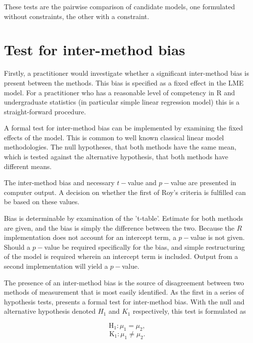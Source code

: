 \documentclass[12pt, a4paper]{report}
\theoremstyle{plain}
\theoremstyle{definition}
\theoremstyle{remark}
\begin{document}
These tests are the pairwise comparison of candidate models, one formulated without constraints, the other with a constraint.

\bigskip



\section{Test for inter-method bias}

Firstly, a practitioner would investigate whether a significant inter-method bias is present between the methods. This bias is specified as a fixed effect in the LME model.  For a practitioner who has a reasonable level of competency in R and undergraduate statistics (in particular simple linear regression model) this is a straight-forward procedure.

A formal test for inter-method bias can be implemented by examining the fixed effects of the model. This is common to well known classical linear model methodologies. The null hypotheses, that both methods have the same mean, which is tested against the alternative hypothesis, that both methods have different means.

The inter-method bias and necessary $t-$value and $p-$value are presented in computer output. A decision on whether the first of Roy's criteria is fulfilled can be based on these values.

Bias is determinable by examination of the 't-table'. Estimate for both methods are given, and the bias is simply the difference between the two. Because the $R$ implementation does not account for an intercept term, a $p-$value is not given. Should a $p-$value be required specifically for the bias, and simple restructuring of the model is required wherein an intercept term is included. Output from a second implementation will yield a $p-$value.

The presence of an inter-method bias is the source of disagreement between two methods of measurement that is most easily identified. As the first in a series of hypothesis tests, \citet{roy} presents a formal test for inter-method bias. With the null and alternative hypothesis denoted $H_1$ and $K_1$ respectively, this test is formulated as

\[	\operatorname{H_1} : \mu_1 = \mu_2 ,\]
\[	\operatorname{K_1} : \mu_1 \neq \mu_2.\]
\end{document}
